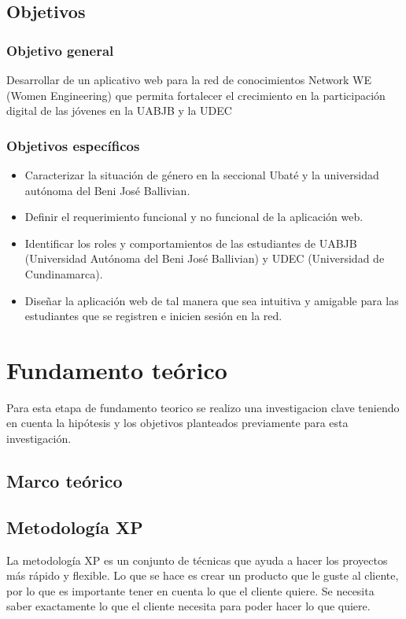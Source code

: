 \documentclass[hidelinks]{Documento}
\begin{document}
\section{Objetivos}

\subsection{Objetivo general}
Desarrollar de un aplicativo web para la red de conocimientos Network WE (Women Engineering) que permita fortalecer el crecimiento en la participación digital de las jóvenes en la UABJB y la UDEC

\subsection{Objetivos específicos}
  
\begin{itemize}
    \item Caracterizar la situación de género en la seccional Ubaté y la universidad autónoma del Beni José Ballivian.
    \item Definir el requerimiento funcional y no funcional de la aplicación web.
    \item Identificar los roles y comportamientos de las estudiantes de UABJB (Universidad Autónoma del Beni José Ballivian) y UDEC (Universidad de Cundinamarca).
    \item Diseñar la aplicación web de tal manera que sea intuitiva y amigable para las estudiantes que se registren e inicien sesión en la red.
\end{itemize}

\chapter{Fundamento teórico}

Para esta etapa de fundamento teorico se realizo una investigacion clave teniendo en cuenta la hipótesis y los objetivos planteados previamente para esta investigación.


\section{Marco teórico}

\section{Metodología XP}
La metodología XP es un conjunto de técnicas que ayuda a hacer los proyectos más rápido y flexible. Lo que se hace es crear un producto que le guste al cliente, por lo que es importante tener en cuenta lo que el cliente quiere. Se necesita saber exactamente lo que el cliente necesita para poder hacer lo que quiere.
\end{document}
